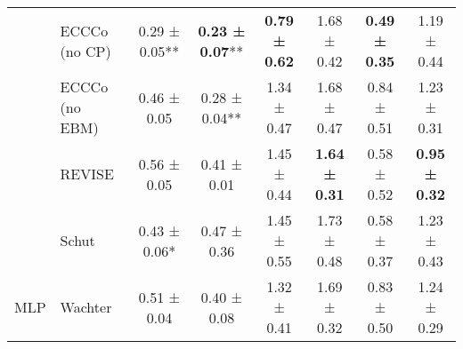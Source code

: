 \begin{table}
{\begin{tabular}[t]{llcccccc}
 & ECCCo (no CP) & 0.29 ± 0.05** & \textbf{0.23 ± 0.07}** & \textbf{0.79 ± 0.62}\hphantom{*}\hphantom{*} & 1.68 ± 0.42\hphantom{*}\hphantom{*} & \textbf{0.49 ± 0.35}\hphantom{*}\hphantom{*} & 1.19 ± 0.44\hphantom{*}\hphantom{*}\\

 & ECCCo (no EBM) & 0.46 ± 0.05\hphantom{*}\hphantom{*} & 0.28 ± 0.04** & 1.34 ± 0.47\hphantom{*}\hphantom{*} & 1.68 ± 0.47\hphantom{*}\hphantom{*} & 0.84 ± 0.51\hphantom{*}\hphantom{*} & 1.23 ± 0.31\hphantom{*}\hphantom{*}\\

 & REVISE & 0.56 ± 0.05\hphantom{*}\hphantom{*} & 0.41 ± 0.01\hphantom{*}\hphantom{*} & 1.45 ± 0.44\hphantom{*}\hphantom{*} & \textbf{1.64 ± 0.31}\hphantom{*}\hphantom{*} & 0.58 ± 0.52\hphantom{*}\hphantom{*} & \textbf{0.95 ± 0.32}\hphantom{*}\hphantom{*}\\

 & Schut & 0.43 ± 0.06*\hphantom{*} & 0.47 ± 0.36\hphantom{*}\hphantom{*} & 1.45 ± 0.55\hphantom{*}\hphantom{*} & 1.73 ± 0.48\hphantom{*}\hphantom{*} & 0.58 ± 0.37\hphantom{*}\hphantom{*} & 1.23 ± 0.43\hphantom{*}\hphantom{*}\\

\multirow{-6}{*}{\raggedright\arraybackslash MLP} & Wachter & 0.51 ± 0.04\hphantom{*}\hphantom{*} & 0.40 ± 0.08\hphantom{*}\hphantom{*} & 1.32 ± 0.41\hphantom{*}\hphantom{*} & 1.69 ± 0.32\hphantom{*}\hphantom{*} & 0.83 ± 0.50\hphantom{*}\hphantom{*} & 1.24 ± 0.29\hphantom{*}\hphantom{*}\\
\bottomrule
\end{tabular}}
\end{table}
